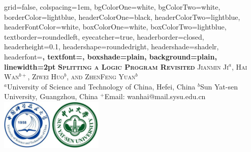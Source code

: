 \documentclass[landscape,final,a0paper,fontscale=0.285]{baposter}
\begin{document}


\begin{poster}%
  {
  grid=false,
  colspacing=1em,
  bgColorOne=white,
  bgColorTwo=white,
  borderColor=lightblue,
  headerColorOne=black,
  headerColorTwo=lightblue,
  headerFontColor=white,
  boxColorOne=white,
  boxColorTwo=lightblue,
  textborder=roundedleft,
  eyecatcher=true,
  headerborder=closed,
  headerheight=0.1\textheight,
  headershape=roundedright,
  headershade=shadelr,
  headerfont=\Large\bf\textsc, %
  textfont={\setlength{\parindent}{1.5em}},
  boxshade=plain,
  background=plain,
  linewidth=2pt
  }
  {}
  {\bf \vspace{-.2em}\textsc{Splitting a Logic Program Revisited}\vspace{0.5em}}
  {
  \textsc{Jianmin Ji$^a$, Hai Wan$^{b+}$, Ziwei Huo$^b$, and ZhenFeng Yuan$^b$}\\
  \vspace{.2em}
  \large
  $^a$University of Science and Technology of China, Hefei, China  \!\hspace{1em} $^b$Sun Yat-sen University, Guangzhou, China \!\hspace{1em} $^+$Email: wanhai@mail.sysu.edu.cn
  }
  {%
    \includegraphics[height=6.5em]{images/SYSU_USTC}
  }


\end{poster}
\end{document}
